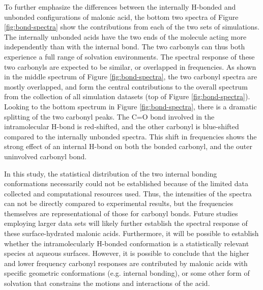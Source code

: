 To further emphasize the differences between the internally H-bonded and unbonded configurations of malonic acid, the bottom two spectra of Figure \ref{fig:bond-spectra} show the contributions from each of the two sets of simulations. The internally unbonded acids have the two ends of the molecule acting more independently than with the internal bond. The two carbonyls can thus both experience a full range of solvation environments. The spectral response of these two carbonyls are expected to be similar, or overlapped in frequencies. As shown in the middle spectrum of Figure \ref{fig:bond-spectra}, the two carbonyl spectra are mostly overlapped, and form the central contributions to the overall spectrum from the collection of all simulation datasets (top of Figure \ref{fig:bond-spectra}). Looking to the bottom spectrum in Figure \ref{fig:bond-spectra}, there is a dramatic splitting of the two carbonyl peaks. The C=O bond involved in the intramolecular H-bond is red-shifted, and the other carbonyl is blue-shifted compared to the internally unbonded spectra. This shift in frequencies shows the strong effect of an internal H-bond on both the bonded carbonyl, and the outer uninvolved carbonyl bond.

In this study, the statistical distribution of the two internal bonding conformations necessarily could not be established because of the limited data collected and computational resources used. Thus, the intensities of the spectra can not be directly compared to experimental results, but the frequencies themselves are representational of those for carbonyl bonds. Future studies employing larger data sets will likely further establish the spectral response of these surface-hydrated malonic acids. Furthermore, it will be possible to establish whether the intramolecularly H-bonded conformation is a statistically relevant species at aqueous surfaces. However, it is possible to conclude that the higher and lower frequency carbonyl responses are contributed by malonic acids with specific geometric conformations (e.g. internal bonding), or some other form of solvation that constrains the motions and interactions of the acid.
